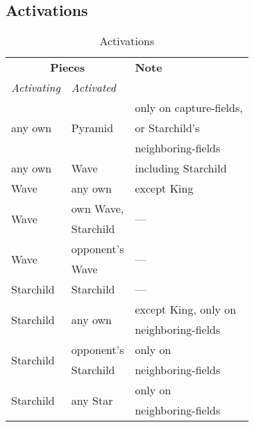 \clearpage %

\subsection*{Activations}
\label{sec:Appendix/Summary/Activations}

\begin{table}[!h]
\centering
\begin{tabular}{ lll }
\toprule
\multicolumn{2}{c}{ \textbf{Pieces} }                   & \textbf{Note}             \\ \cmidrule{1-2}
\emph{Activating}           & \emph{Activated}          &                           \\
\midrule
\multirow{3}{*}{any own}    & \multirow{3}{*}{Pyramid}  & only on capture-fields,   \\
                            &                           & or Starchild's            \\
                            &                           & neighboring-fields        \\ \cmidrule{1-3}
any own                     & Wave                      & including Starchild       \\ \cmidrule{1-3}
Wave\footnotemark[1]        & any own                   & except King               \\ \cmidrule{1-3}
\multirow{2}{*}{Wave}       & own Wave,                 & \multirow{2}{*}{---}      \\
                            & Starchild                 &                           \\ \cmidrule{1-3}
\multirow{2}{*}{Wave}       & opponent's                & \multirow{2}{*}{---}      \\
                            & Wave                      &                           \\ \cmidrule{1-3}
Starchild                   & Starchild                 & ---                       \\ \cmidrule{1-3}
\multirow{2}{*}{Starchild}  & \multirow{2}{*}{any own}  & except King, only on      \\
                            &                           & neighboring-fields        \\ \cmidrule{1-3}
\multirow{2}{*}{Starchild}  & opponent's                & only on                   \\
                            & Starchild                 & neighboring-fields        \\ \cmidrule{1-3}
\multirow{2}{*}{Starchild}  & \multirow{2}{*}{any Star} & only on                   \\
                            &                           & neighboring-fields        \\
\bottomrule
\end{tabular}
\caption{Activations}
\label{tbl:Appendix/Summary/Activations}
\end{table}

